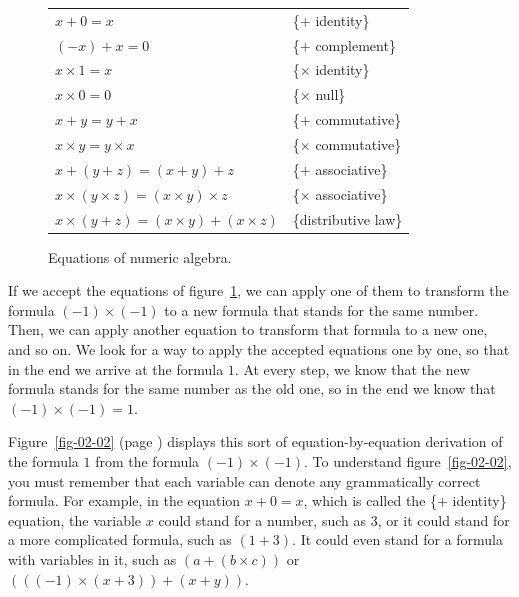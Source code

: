 \begin{figure}
\begin{center}
\begin{spacing}{0.9}
\begin{tabular}{ll}
$x+0 = x$                 & \{$+$ identity\} \\
$(-x)+ x = 0$             & \{$+$ complement\} \\
$x \times 1 = x$          & \{$\times$ identity\} \\
$x \times 0 = 0$          & \{$\times$ null\} \\
$x+y = y+x$               & \{$+$ commutative\} \\
$x \times y = y \times x$ & \{$\times$ commutative\} \\
$x+(y+z) = (x+y)+z$       & \{$+$ associative\} \\
$x \times (y \times z) = (x \times y) \times z$ & \{$\times$ associative\} \\
$x\times(y+z) = (x \times y)+(x \times z)$      & \{distributive law\} \\
\end{tabular}
\end{spacing}
\end{center}
\caption{Equations of numeric algebra.}
\label{fig-02-01}
\end{figure}

If we accept the equations of figure~\ref{fig-02-01},
we can apply one of them to transform the formula $(-1)\times(-1)$ to a new formula that
stands for the same number. Then, we can apply another equation to
transform that formula to a new one, and so on.
We look for a way to apply the
accepted equations one by one, so that in the end we
arrive at the formula $1$. At every step, we know that the
new formula stands for the same number as the old one, so in
the end we know that $(-1)\times(-1) = 1$.

Figure~\ref{fig-02-02} (page \pageref{fig-02-02})
displays this sort of equation-by-equation derivation of the
formula $1$ from the formula $(-1)\times(-1)$. To
understand figure~\ref{fig-02-02}, you must remember that each
variable can denote any
grammatically correct formula. For example, in the
equation $x + 0 = x$,
which is called the \{$+$ identity\} equation,
the variable $x$ could stand for a number,
such as 3, or it could stand for a more complicated
formula, such as $(1 + 3)$. It could even stand for a formula
with variables in it, such as $(a + (b \times c))$ or
$(((-1) \times (x + 3)) + (x + y))$.


